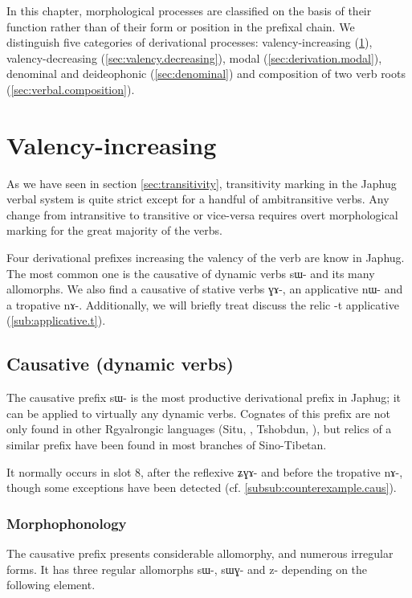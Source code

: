 \documentclass[oldfontcommands,oneside,a4paper,11pt]{memoir}
\newcommand{\ipa}[1]{{\phon #1}} %
\begin{document}
In this chapter, morphological processes are classified on the basis of their function rather than of their form or position in the prefixal chain. We distinguish five categories of derivational processes: valency-increasing (\ref{sec:valency.increasing}), valency-decreasing (\ref{sec:valency.decreasing}), modal (\ref{sec:derivation.modal}), denominal and deideophonic (\ref{sec:denominal}) and composition of two verb roots (\ref{sec:verbal.composition}).


\section{Valency-increasing} \label{sec:valency.increasing}
As we have seen in section \ref{sec:transitivity}, transitivity marking in the Japhug verbal system is quite strict except for a handful of ambitransitive verbs. Any change from intransitive to transitive or vice-versa requires overt morphological marking for the great majority of the verbs.

Four derivational prefixes increasing the valency of the verb are know in Japhug. The most common one is the causative of dynamic verbs \ipa{sɯ-} and its many allomorphs. We also find a causative of stative verbs \ipa{ɣɤ-}, an applicative \ipa{nɯ-} and a tropative \ipa{nɤ-}. Additionally, we will briefly treat discuss the relic \ipa{-t} applicative (\ref{sub:applicative.t}).

\subsection{Causative (dynamic verbs)} \label{sub:caus1}
The causative prefix \ipa{sɯ-} is the most productive derivational prefix in Japhug; it can be applied to virtually any dynamic verbs. Cognates of this prefix are not only found in other Rgyalrongic languages (Situ, \citet{linxr93jiarong}, Tshobdun, \citet{jackson06paisheng}), but relics of a similar prefix have been found in most branches of Sino-Tibetan.

It normally occurs in slot 8, after the reflexive \ipa{ʑɣɤ-} and before the tropative \ipa{nɤ-}, though some exceptions have been detected (cf. \ref{subsub:counterexample.caus}).

\subsubsection{Morphophonology} \label{subsub:caus:morphophon}
The causative prefix presents  considerable allomorphy, and numerous irregular forms. It has three regular allomorphs \ipa{sɯ-}, \ipa{sɯɣ-} and \ipa{z-} depending on the following element.
\end{document}
